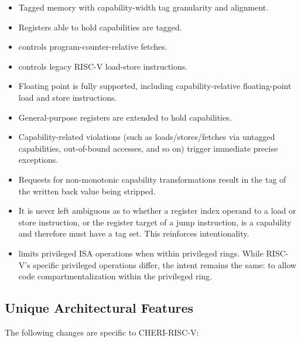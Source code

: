 \begin{itemize}
\item Tagged memory with capability-width tag granularity and alignment.
\item Registers able to hold capabilities are tagged.
\item \PCC{} controls program-counter-relative fetches.
\item \DDC{} controls legacy RISC-V load-store instructions.
\item Floating point is fully supported, including capability-relative
  floating-point load and store instructions.
\item General-purpose registers are extended to hold capabilities.
\item Capability-related violations (such as loads/stores/fetches via untagged
  capabilities, out-of-bound accesses, and so on) trigger immediate precise
  exceptions.
\item Requests for non-monotonic capability transformations result in
  the tag of the written back value being stripped.
\item It is never left ambiguous as to whether a register index operand to a
  load or store instruction, or the register target of a jump instruction,
  is a capability and therefore must have a tag set.
  This reinforces intentionality.
\item \cappermASR limits privileged ISA
  operations when within privileged rings.
  While RISC-V's specific privileged operations differ, the intent remains the
  same: to allow code compartmentalization within the privileged ring.
\end{itemize}

\subsection{Unique Architectural Features}

The following changes are specific to CHERI-RISC-V:


